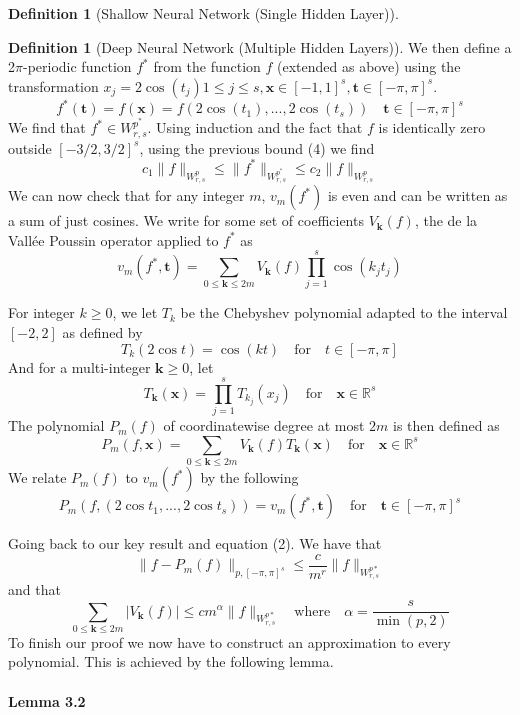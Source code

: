 \documentclass[11pt,a4paper]{article}
\theoremstyle{plain}
\theoremstyle{definition}
\newtheorem{definition}[theorem]{Definition}
\theoremstyle{remark}
\begin{document}
\begin{definition}[Shallow Neural Network (Single Hidden Layer)]
\begin{definition}[Deep Neural Network (Multiple Hidden Layers)]
We then define a 2\(\pi\)-periodic function \(f^*\) from the function \(f\) (extended as above) using the transformation \(x_{j} = 2 \cos (t_{j}) 1 \leq j \leq s, \mathbf{x} \in [-1,1]^s, \mathbf{t} \in [-\pi ,\pi ]^s\).\\
\[
    f^*(\mathbf{t}) = f(\mathbf{x}) = f(2 \cos(t_1),...,2 \cos(t_s)) \quad \mathbf{t} \in [-\pi ,\pi ]^s
\]
We find that \(f^{\ast} \in W_{r,s}^{p^{\ast}}\). Using induction and the fact that \(f\) is identically zero outside \([-3/2,3/2]^s\), using the previous bound (4) we find
\[
    c_{1} \|f\|_{W_{r,s}^{p}} \leq \|f^{\ast}\|_{W_{r,s}^{p^{\ast}}} \leq c_{2} \|f\|_{W_{r,s}^{p}}
\]
We can now check that for any integer \(m\), \(v_{m}(f^{\ast} )\) is even and can be written as a sum of just cosines. We write for some set of coefficients \(V_{\mathbf{k} }(f)\), the de la Vallée Poussin operator applied to \(f^{\ast}\) as
\[
    v_{m}(f^{\ast}, \mathbf{t} ) = \sum_{0 \leq \mathbf{k} \leq 2m} V_{\mathbf{k}}(f) \prod_{j=1}^{s} \cos(k_{j}t_{j})
\]

For integer \(k \geq 0 \), we let \(T_{k}\) be the Chebyshev polynomial adapted to the interval \([-2,2]\) as defined by
\[
    T_{k}(2\cos t) = \cos(kt) \quad \text{for} \quad t \in [-\pi ,\pi ]
\]
And for a multi-integer \(\mathbf{k} \geq 0\), let 
\[
    T_{\mathbf{k}}(\mathbf{x}) = \prod_{j=1}^{s} T_{k_{j}}(x_{j}) \quad \text{for} \quad \mathbf{x} \in \mathbb{R}^{s}
\]
The polynomial \(P_{m}(f)\) of coordinatewise degree at most \(2m\) is then defined as
\[
    P_{m}(f, \mathbf{x}) = \sum_{0 \leq \mathbf{k} \leq 2m} V_{\mathbf{k}}(f) T_{\mathbf{k}}(\mathbf{x}) \quad \text{for} \quad \mathbf{x} \in \mathbb{R}^{s}  
\]
We relate \(P_{m}(f)\) to \(v_{m}(f^{\ast})\) by the following
\[
    P_{m}(f, (2\cos t_1, ..., 2\cos t_s)) = v_{m}(f^{\ast}, \mathbf{t}) \quad \text{for} \quad \mathbf{t} \in [-\pi ,\pi ]^s
\]

Going back to our key result and equation (2). We have that
\[
    \|f - P_{m}(f)\|_{p,[-\pi,\pi]^s} \leq \frac{c}{m^r} \|f\|_{W^{p*}_{r,s}}
\]
and that 
\[
    \sum_{0 \leq \mathbf{k} \leq 2m} |V_{\mathbf{k}}(f)| \leq cm^{\alpha} \|f\|_{W^{p*}_{r,s}}  \quad \text{where} \quad \alpha = \frac{s}{\min(p,2)}  
\]
To finish our proof we now have to construct an approximation to every polynomial. This is achieved by the following lemma.

\paragraph[short]{Lemma 3.2}


\end{definition}
\end{definition}
\end{document}
